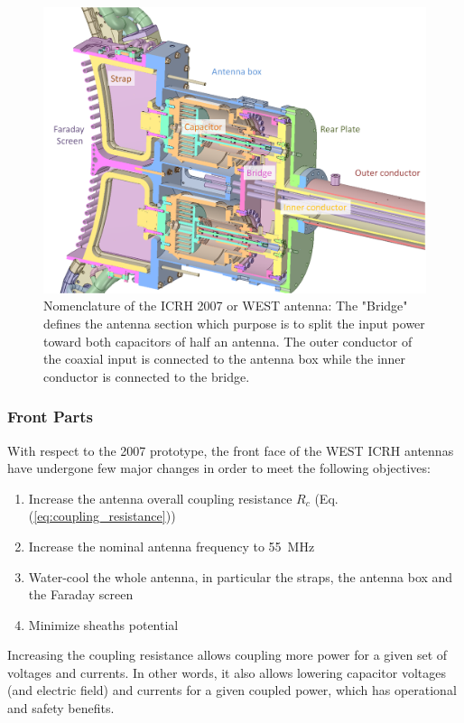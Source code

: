 \begin{figure}
	\centering
	\includegraphics[width=0.7\linewidth]{figures/chap3/WEST_ICRH/proto2007_antenna_cut}
	\caption{Nomenclature of the ICRH 2007 or WEST antenna: The "Bridge" defines the antenna section which purpose is to split the input power toward both capacitors of half an antenna. The outer conductor of the coaxial input is connected to the antenna box while the inner conductor is connected to the bridge.}
	\label{fig:proto2007antennacut}
\end{figure}


\subsubsection{Front Parts}
With respect to the 2007 prototype, the front face of the WEST ICRH antennas have undergone few major changes in order to meet the following objectives:
\begin{enumerate}
	\item Increase the antenna overall coupling resistance $R_c$ (Eq.(\ref{eq:coupling_resistance}))
	\item Increase the nominal antenna frequency to 55~MHz
	\item Water-cool the whole antenna, in particular the straps, the antenna box and the Faraday screen
	\item Minimize sheaths potential
\end{enumerate}

Increasing the coupling resistance allows coupling more power for a given set of voltages and currents. In other words, it also allows lowering capacitor voltages (and electric field) and currents for a given coupled power, which has operational and safety benefits. 

